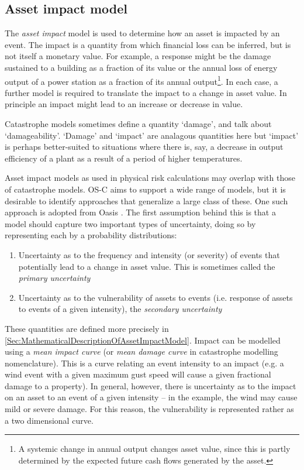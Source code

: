 \documentclass{article}
\begin{document}
\subsection{Asset impact model}
\label{SubSec:AcuteAssetImpactModel}
The {\it asset impact} model is used to determine how an asset is impacted by an event. The impact is a quantity from which financial loss can be inferred, but is not itself a monetary value. For example, a response might be the damage sustained to a building as a fraction of its value or the annual loss of energy output of a power station as a fraction of its annual output\footnote{A systemic change in annual output changes asset value, since this is partly determined by the expected future cash flows generated by the asset.}. In each case, a further model is required to translate the impact to a change in asset value. In principle an impact might lead to an increase or decrease in value.

Catastrophe models sometimes define a quantity `damage', and talk about `damageability'. `Damage' and `impact' are analagous quantities here but `impact' is perhaps better-suited to situations where there is, say, a decrease in output efficiency of a plant as a result of a period of higher temperatures.

Asset impact models as used in physical risk calculations may overlap with those of catastrophe models. OS-C aims to support a wide range of models, but it is desirable to identify approaches that generalize a large class of these. One such approach is adopted from Oasis \cite{OasisLMF}. The first assumption behind this is that a model should capture two important types of uncertainty, doing so by representing each by a probability distributions:
\begin{enumerate}
    \item Uncertainty as to the frequency and intensity (or severity) of events that potentially lead to a change in asset value. This is sometimes called the {\it primary uncertainty}
    \item Uncertainty as to the vulnerability of assets to events (i.e. response of assets to events of a given intensity), the {\it secondary uncertainty}
\end{enumerate}

These quantities are defined more precisely in \ref{Sec:MathematicalDescriptionOfAssetImpactModel}. Impact can be modelled using a {\it mean impact curve} (or {\it mean damage curve} in catastrophe modelling nomenclature). This is a curve relating an event intensity to an impact (e.g. a wind event with a given maximum gust speed will cause a given fractional damage to a property). In general, however, there is uncertainty as to the impact on an asset to an event of a given intensity -- in the example, the wind may cause mild or severe damage. For this reason, the vulnerability is represented rather as a two dimensional curve.
\end{document}
